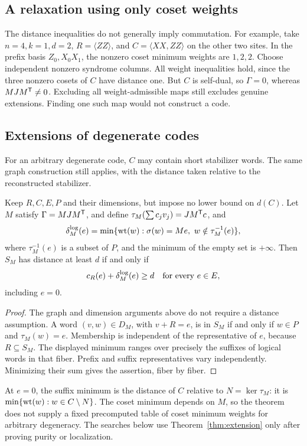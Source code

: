 \subsection{A relaxation using only coset weights}

The distance inequalities do not generally imply commutation. For example,
take \(n=4,k=1,d=2\), \(R=\langle ZZ\rangle\), and
\(C=\langle XX,ZZ\rangle\) on the other two sites. In the prefix basis
\(Z_0,X_0X_1\), the nonzero coset minimum weights are \(1,2,2\). Choose independent
nonzero syndrome columns. All weight inequalities hold, since the three
nonzero cosets of \(C\) have distance one. But \(C\) is self-dual,
so \(\Gamma=0\), whereas \(MJM^\mathsf T\ne0\).
Excluding all weight-admissible maps still excludes genuine extensions.
Finding one such map would not construct a code.

\subsection{Extensions of degenerate codes}

For an arbitrary degenerate code, \(C\) may contain short stabilizer words.
The same graph construction still applies, with the distance taken relative
to the reconstructed stabilizer.

\begin{theorem}\label{thm:relative}
Keep \(R,C,E,P\) and their dimensions, but impose no lower bound on
\(d(C)\). Let \(M\) satisfy \(\Gamma=MJM^\mathsf T\), and define
\(\tau_M(\sum c_jv_j)=JM^\mathsf T c\), and
\[
 \delta_M^{\rm log}(e)=\min\{\operatorname{wt}(w):\sigma(w)=Me,\
             w\notin\tau_M^{-1}(e)\},
\]
where \(\tau_M^{-1}(e)\) is a subset of \(P\), and the minimum of
the empty set is \(+\infty\).
Then \(S_M\) has distance at least \(d\) if and only if
\[
 c_R(e)+\delta_M^{\rm log}(e)\geq d\quad\text{for every }e\in E,
\]
including \(e=0\).
\end{theorem}
\begin{proof}
The graph and dimension arguments above do not require a distance assumption.
A word \((v,w)\in D_M\), with \(v+R=e\), is in \(S_M\) if and only if
\(w\in P\) and \(\tau_M(w)=e\). Membership is independent of the
representative of \(e\), because \(R\subseteq S_M\). The displayed
minimum ranges over precisely the suffixes of logical words in
that fiber. Prefix and suffix representatives vary independently. Minimizing
their sum gives the assertion, fiber by fiber.
\end{proof}

At \(e=0\), the suffix minimum is the distance of \(C\) relative to
\(N=\ker\tau_M\): it is \(\min\{\operatorname{wt}(w):w\in C\setminus N\}\).
The coset minimum depends on \(M\), so the theorem does not supply a fixed
precomputed table of coset minimum weights for arbitrary degeneracy. The searches below
use Theorem~\ref{thm:extension} only after proving purity or localization.
